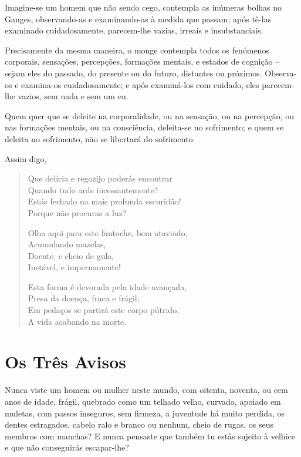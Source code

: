 Imagine-se um homem que não sendo cego, contempla as inúmeras bolhas no Ganges,
observando-as e examinando-as à medida que passam; após tê-las examinado
cuidadosamente, parecem-lhe vazias, irreais e insubstanciais.

Precisamente da mesma maneira, o monge contempla todos os fenómenos corporais,
sensações, percepções, formações mentais, e estados de cognição -- sejam eles do
passado, do presente ou do futuro, distantes ou próximos. Observa-os e
examina-os cuidadosamente; e após examiná-los com cuidado, eles parecem-lhe
vazios, sem nada e sem um eu.


Quem quer que se deleite na corporalidade, ou na sensação, ou na percepção, ou
nas formações mentais, ou na consciência, deleita-se no sofrimento; e quem se
deleita no sofrimento, não se libertará do sofrimento.


\clearpage

Assim digo,

\begin{verse}
Que delícia e regozijo poderás encontrar\\
Quando tudo arde incessantemente?\\
Estás fechado na mais profunda escuridão!\\
Porque não procuras a luz?

Olha aqui para este fantoche, bem ataviado,\\
Acumulando mazelas,\\
Doente, e cheio de gula,\\
Instável, e impermanente!

Esta forma é devorada pela idade avançada,\\
Presa da doença, fraca e frágil;\\
Em pedaços se partirá este corpo pútrido,\\
A vida acabando na morte.
\end{verse}


\section{Os Três Avisos}

Nunca viste um homem ou mulher neste mundo, com oitenta, noventa, ou cem anos de
idade, frágil, quebrado como um telhado velho, curvado, apoiado em muletas, com
passos inseguros, sem firmeza, a juventude há muito perdida, os dentes
estragados, cabelo ralo e branco ou nenhum, cheio de rugas, os seus membros com
manchas? E nunca pensaste que também tu estás sujeito à velhice e que não
conseguirás escapar-lhe?

